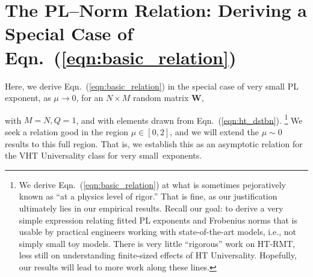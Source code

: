 



\section{The PL--Norm Relation: Deriving a Special Case of Eqn.~(\ref{eqn:basic_relation})}
\label{sxn:appendix-derivation-pl-norm-relation}

Here, we derive Eqn.~(\ref{eqn:basic_relation}) in the special case of very small PL exponent, 
as 
$\mu \rightarrow 0$, 
for an $N \times M$ random matrix $\mathbf{W}$, {with $M=N, Q=1$, and with elements drawn from Eqn.~(\ref{eqn:ht_dstbn}).%
\footnote{We derive Eqn.~(\ref{eqn:basic_relation}) at what is sometimes pejoratively known as ``at a physics level of rigor.''  That is fine, as our justification ultimately lies in our empirical results.  Recall our goal: to derive a very simple expression relating fitted PL exponents and Frobenius norms that is usable by practical engineers working with state-of-the-art models, i.e., not simply small toy models.  There is very little ``rigorous'' work on HT-RMT, less still on understanding finite-sized effects of HT Universality.  Hopefully, our results will lead to more work along these lines.  }
We seek a relation good in the region $\mu\in[0,2]$, and we will extend the $\mu\sim 0$ results to this full region.
That is, we establish this as an asymptotic relation for the VHT Universality class for very small~exponents.

}

